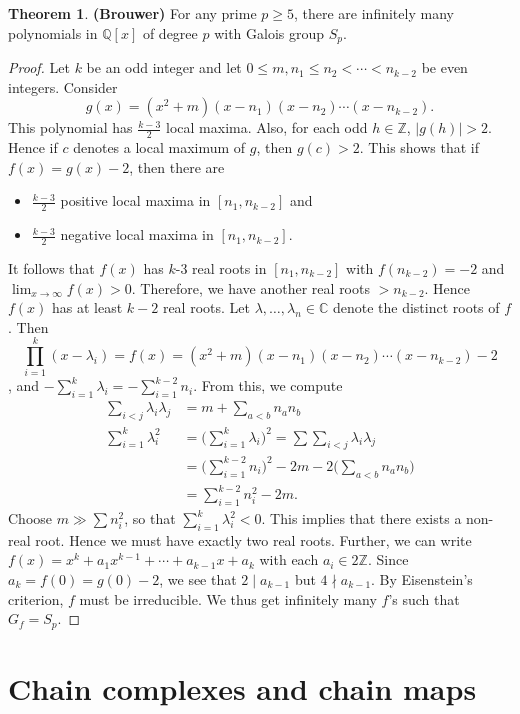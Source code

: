 \documentclass[10pt,letterpaper,cm]{nupset}
\theoremstyle{definition}
\newtheorem{theorem}{Theorem}
\newcommand{\C}{\mathbb C}
\newcommand{\Q}{\mathbb Q}
\newcommand{\Z}{\mathbb Z}
\newcommand{\1}{\mathbf{1}}
\newcommand{\0}{\vec 0}
\begin{document}
\begin{theorem}{\textbf{(Brouwer)}}
For any prime $p \geq 5$, there are infinitely many polynomials in $\Q[x]$ of degree $p$ with Galois group $S_p$.
\end{theorem}
\begin{proof}
Let $k$ be an odd integer and let $0\leq m, n_1 \leq n_2 < \cdots < n_{k-2}$ be even integers. Consider $$g(x) = (x^2 +m)(x-n_1)(x-n_2) \cdots (x-n_{k-2}).$$ This polynomial has $\frac{k-3}{2}$ local maxima. Also, for each odd $h\in \Z$, $|g(h)| >2$. Hence if $c$ denotes a local maximum of $g$, then $g(c) >2$. This shows that if $f(x) = g(x) -2$, then there are 
\begin{itemize}
\item $\frac{k-3}{2}$ positive local maxima in $[n_1, n_{k-2}]$ and
\item $\frac{k-3}{2}$ negative local maxima in $[n_1, n_{k-2}]$.
\end{itemize}
It follows that $f(x)$ has $k$-3 real roots in $[n_1, n_{k-2}]$ with $f(n_{k-2}) = {-}2$ and $\lim_{x\to \infty} f(x) >0$. Therefore, we have another real roots $> n_{k-2}$. Hence $f(x)$ has at least $k-2$ real roots. Let $\lambda, \ldots, \lambda_n \in \C$ denote the distinct roots of $f$. Then $$\prod_{i=1}^k(x-\lambda_i) = f(x) = (x^2 +m)(x-n_1)(x-n_2) \cdots (x-n_{k-2}) -2$$, and ${-}\sum_{i=1}^k \lambda_i = {-} \sum_{i=1}^{k-2} n_i$. From this, we compute
\begin{align*}
\sum_{i <j} \lambda_i \lambda_j & = m + \sum_{a < b} n_an_b 
\\ \sum_{i=1}^k \lambda_i^2 & = \big (\sum_{i=1}^k \lambda_i \big )^2 = \sum \sum_{i<j} \lambda _i \lambda_j
\\ & = \big ( \sum_{i=1}^{k-2} n_i \big )^2 -2m - 2 \big ( \sum_{a<b} n_an_b \big )
\\ & = \sum_{i=1}^{k-2} n_i^2 - 2m.
\end{align*}
Choose $m \gg \sum n_i^2$, so that $\sum_{i=1}^k \lambda_i^2  < 0$. This implies that there exists a non-real root. Hence we must have exactly two real roots. Further,  we can write $f(x) = x^k + a_1x^{k-1} + \cdots +a_{k-1} x +a_k$ with each $a_i \in 2\Z$. Since $a_k = f(0) = g(0) -2$, we see that $2 \mid a_{k-1}$ but $4 \nmid a_{k-1}$. By Eisenstein's criterion, $f$ must be irreducible. We thus get infinitely many $f$'s such that $G_f = S_p$. 
\end{proof}

\section{Chain complexes and chain maps}
\end{document}
